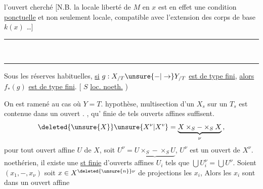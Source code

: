 l'ouvert cherché [N.B. la locale liberté de $M$ en
$x$ est en effet une condition \uline{ponctuelle}
et non seulement locale,  compatible avec
l'extension des corps de base $k(x)$ \ldots]

\noindent\rule{3cm}{0.4pt}\\[-0.8ex]
\rule{2.8cm}{0.4pt}

Sous les réserves habituelles, \uline{si} $g:X_{/T}\unsure{\mathbin{-}|\to}Y_{/T}$ \uline{est de
type fini}, \uline{alors} $f_\ast(g)$ \uline{est de type fini}.
[ $S$  \uline{loc. noeth.} )

On est ramené au cas où $Y=T$.  
hypothèse,  multisection d'un
$X_s$ sur un $T_s$ est contenue dans un ouvert .
, qu' finie de tels ouverts
affines  suffisent.  
\[
\deleted{\unsure{X}}\unsure{X^{\nu}|X^{v}}=
\underbrace{X\times_S\mathbin{-}\times_S X}_{\nu}\,,
\]
pour tout ouvert affine
$U$ de $X$, soit $U^\nu=\underbrace{U\times_S\mathbin{-}\times_S U}$, $U^\nu$ est un
ouvert de $X^\nu$.  
noethérien, il existe une \uline{st finie} d'ouverts
affines $U_i$ tels que $\bigcup U_i^\nu=\bigcup U^\nu$.
Soient $(x_1,\mathbin{-},x_\nu)$ soit $x\in X^{\deleted{\unsure{n}}\nu}$ de projections les $x_i$,
Alors les $x_i$ sont dans un ouvert affine
